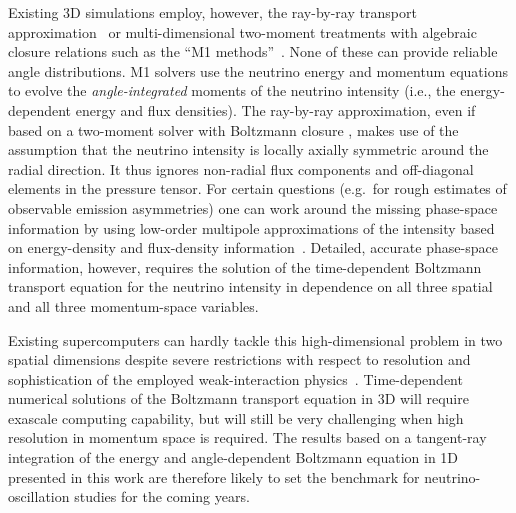 \documentclass[iop,twocolappendix,numberedappendix]{emulateapj}
\begin{document}
 Existing 3D simulations employ, however, the
  ray-by-ray transport approximation~\citep[]{Melson:2015tia,Melson:2015spa,2015ApJ...807L..31L,Takiwaki:2013cqa}
  or multi-dimensional two-moment treatments with algebraic
  closure relations such as the ``M1 methods''~\cite[]{Roberts:2016lzn}. 
  None of these can
  provide reliable angle distributions. M1 solvers use the
  neutrino energy and momentum equations to evolve
  the {\em angle-integrated} moments of the neutrino intensity
  (i.e., the energy-dependent energy and flux densities).
  The ray-by-ray approximation, even if based on a two-moment solver
  with Boltzmann closure \citep{RamppJanka2002,Burasetal2006},
  makes use of the assumption that the neutrino intensity is
  locally axially symmetric around the radial direction. It
  thus ignores non-radial flux components and off-diagonal
  elements in the pressure tensor. 
  For certain questions 
  (e.g.\ for rough estimates of observable emission asymmetries)
  one can work around the missing phase-space information by
  using low-order multipole approximations of the intensity
  based on energy-density and flux-density information~\citep[]{Muller:2011yi,Tamborra:2014hga}. Detailed, accurate phase-space information,
  however, requires the solution of the time-dependent 
  Boltzmann transport equation for the neutrino intensity
  in dependence on all three spatial and all three momentum-space
  variables. 
  
  Existing supercomputers can hardly tackle this 
  high-dimensional problem in two spatial dimensions
  despite severe restrictions
  with respect to resolution and sophistication
  of the employed weak-interaction physics~\citep{Ott:2008jb,Brandt:2010xa,Nagakura:2017mnp}.
  Time-dependent numerical solutions of the Boltzmann transport 
  equation in 3D will require exascale computing capability,
  but will still be very challenging when high resolution in 
  momentum space is required. The results based on a tangent-ray
  integration of the energy and angle-dependent Boltzmann 
  equation in 1D presented in this work are therefore likely
  to set the benchmark for neutrino-oscillation studies for the
  coming years.


\end{document}
